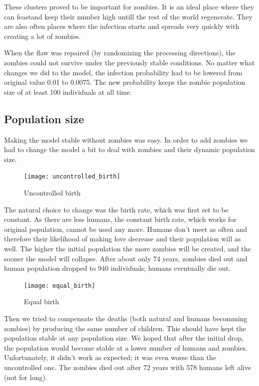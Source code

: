 \documentclass[a4paper]{article}
\begin{document}
These clusters proved to be important for zombies.
It is an ideal place where they can feastand keep their number high untill the rest of the world regenerate.
They are also often places where the infection starts and spreads very quickly with creating a lot of zombies.

When the flaw was repaired (by randomizing the processing directions), the zombies could not survive under the previously stable conditions.
No matter what changes we did to the model, the infection probability had to be lowered from original value 0.01 to 0.0075.
The new probability keeps the zombie population size of at least 100 individuals at all time.

\subsection{Population size}

Making the model stable without zombies was easy.
In order to add zombies we had to change the model a bit to deal with zombies and their dynamic population size.

\begin{figure}[pht]
    \centering
    \texttt{[image: uncontrolled\_birth]}
    \caption{Uncontrolled birth}
\end{figure}

The natural choice to change was the birth rate, which was first set to be constant.
As there are less humans, the constant birth rate, which works for original population, cannot be used any more.
Humans don't meet as often and therefore their likelihood of making love decrease and their population will as well.
The higher the initial population the more zombies will be created, and the sooner the model will collapse.
After about only 74 years, zombies died out and human population dropped to 940 individuals; humans eventually die out.

\begin{figure}[pht]
    \centering
    \texttt{[image: equal\_birth]}
    \caption{Equal birth}
\end{figure}

Then we tried to compensate the deaths (both natural and humans becomming zombies) by producing the same number of children.
This should have kept the population stable at any population size.
We hoped that after the initial drop, the population would become stable at a lower number of humans and zombies.
Unfortunately, it didn't work as expected; it was even worse than the uncontrolled one.
The zombies died out after 72 years with 578 humans left alive (not for long).
\end{document}
